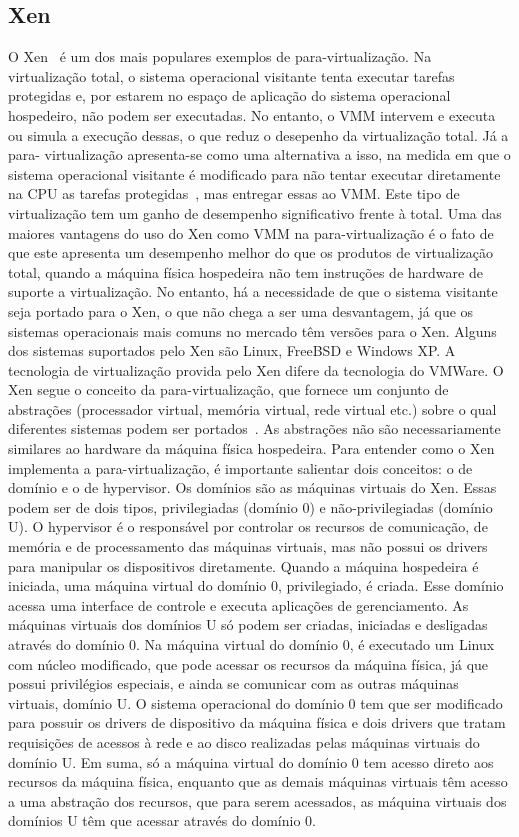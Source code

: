 \subsection{Xen}
O Xen~\cite{benevenuto} é um dos mais populares exemplos de para-virtualização. Na virtualização total, o sistema operacional visitante tenta executar tarefas protegidas e, por estarem no espaço de aplicação
do sistema operacional hospedeiro, não podem ser executadas. No entanto, o VMM intervem e
executa ou simula a execução dessas, o que reduz o desepenho da virtualização total. Já a para-
virtualização apresenta-se como uma alternativa a isso, na medida em que o sistema operacional
visitante é modificado para não tentar executar diretamente na CPU as tarefas protegidas~\cite{ferrazani}, mas
entregar essas ao VMM. Este tipo de virtualização tem um ganho de desempenho significativo
frente à total.
Uma das maiores vantagens do uso do Xen como VMM na para-virtualização é o fato de
que este apresenta um desempenho melhor do que os produtos de virtualização total, quando a
máquina física hospedeira não tem instruções de hardware de suporte a virtualização. No entanto,
há a necessidade de que o sistema visitante seja portado para o Xen, o que não chega a ser uma
desvantagem, já que os sistemas operacionais mais comuns no mercado têm versões para o Xen.
Alguns dos sistemas suportados pelo Xen são Linux, FreeBSD e Windows XP.
A tecnologia de virtualização provida pelo Xen difere da tecnologia do VMWare. O Xen
segue o conceito da para-virtualização, que fornece um conjunto de abstrações (processador virtual,
memória virtual, rede virtual etc.) sobre o qual diferentes sistemas podem ser portados~\cite{ferrazani}. As
abstrações não são necessariamente similares ao hardware da máquina física hospedeira.
Para entender como o Xen implementa a para-virtualização, é importante salientar dois
conceitos: o de domínio e o de hypervisor. Os domínios são as máquinas virtuais do Xen. Essas
podem ser de dois tipos, privilegiadas (domínio 0) e não-privilegiadas (domínio U). O hypervisor é
o responsável por controlar os recursos de comunicação, de memória e de processamento das
máquinas virtuais, mas não possui os drivers para manipular os dispositivos diretamente.
Quando a máquina hospedeira é iniciada, uma máquina virtual do domínio 0, privilegiado,
é criada. Esse domínio acessa uma interface de controle e executa aplicações de gerenciamento. As
máquinas virtuais dos domínios U só podem ser criadas, iniciadas e desligadas através do domínio
0. Na máquina virtual do domínio 0, é executado um Linux com núcleo modificado, que pode
acessar os recursos da máquina física, já que possui privilégios especiais, e ainda se comunicar com
as outras máquinas virtuais, domínio U.
O sistema operacional do domínio 0 tem que ser modificado para possuir os drivers de
dispositivo da máquina física e dois drivers que tratam requisições de acessos à rede e ao disco realizadas pelas máquinas virtuais do domínio U. Em suma, só a máquina virtual do domínio 0 tem
acesso direto aos recursos da máquina física, enquanto que as demais máquinas virtuais têm acesso
a uma abstração dos recursos, que para serem acessados, as máquina virtuais dos domínios U têm
que acessar através do domínio 0.

